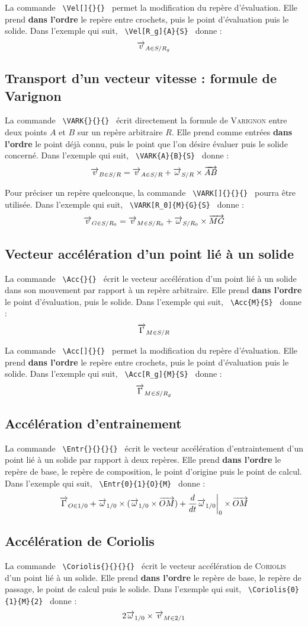 \documentclass[12pt]{article}
\begin{document}
La commande \verb| \Vel[]{}{} | permet la modification du repère d'évaluation. Elle prend \textbf{dans l'ordre} le repère entre crochets, puis le point d'évaluation puis le solide. Dans l'exemple qui suit, \verb| \Vel[R_g]{A}{S} | donne : $$\Vel[R_g]{A}{S}$$

\subsection{Transport d'un vecteur vitesse : formule de Varignon}
La commande \verb| \VARK{}{}{} | écrit directement la formule de \textsc{Varignon} entre deux points $A$ et $B$ sur un repère arbitraire $R$. Elle prend comme entrées \textbf{dans l'ordre} le point déjà connu, puis le point que l'on désire évaluer puis le solide concerné. Dans l'exemple qui suit, \verb| \VARK{A}{B}{S} | donne : $$\VARK{A}{B}{S}$$

Pour préciser un repère quelconque, la commande \verb| \VARK[]{}{}{} | pourra être utilisée. Dans l'exemple qui suit, \verb| \VARK[R_0]{M}{G}{S} | donne : $$\VARK[R_0]{M}{G}{S}$$

\subsection{Vecteur accélération d'un point lié à un solide}
La commande \verb| \Acc{}{} | écrit le vecteur accélération d'un point lié à un solide dans son mouvement par rapport à un repère arbitraire. Elle prend \textbf{dans l'ordre} le point d'évaluation, puis le solide. Dans l'exemple qui suit, \verb| \Acc{M}{S} | donne : $$\Acc{M}{S}$$

La commande \verb| \Acc[]{}{} | permet la modification du repère d'évaluation. Elle prend \textbf{dans l'ordre} le repère entre crochets, puis le point d'évaluation puis le solide. Dans l'exemple qui suit, \verb| \Acc[R_g]{M}{S} | donne : $$\Acc[R_g]{M}{S}$$

\subsection{Accélération d'entrainement}
La commande \verb| \Entr{}{}{}{} | écrit le vecteur accélération d'entraintement d'un point lié à un solide par rapport à deux repères. Elle prend \textbf{dans l'ordre} le repère de base, le repère de composition, le point d'origine puis le point de calcul. Dans l'exemple qui suit, \verb| \Entr{0}{1}{O}{M} | donne : $$\Entr{0}{1}{O}{M}$$

\subsection{Accélération de Coriolis}
La commande \verb| \Coriolis{}{}{}{} | écrit le vecteur accélération de \textsc{Coriolis} d'un point lié à un solide. Elle prend \textbf{dans l'ordre} le repère de base, le repère de passage, le point de calcul puis le solide. Dans l'exemple qui suit, \verb| \Coriolis{0}{1}{M}{2} | donne : $$\Coriolis{0}{1}{M}{2}$$
\end{document}
